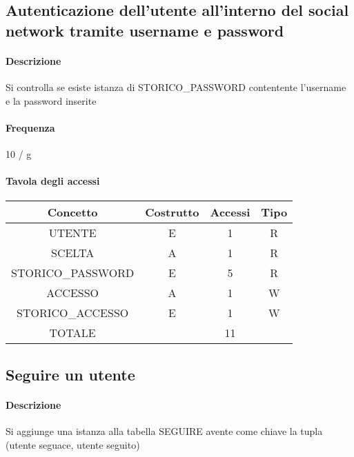 \documentclass[a4paper,12pt]{report}
\begin{document}
\subsection{Autenticazione dell'utente all'interno del social network tramite username e password} \label{autenticazione}
\paragraph{Descrizione} Si controlla se esiste istanza di STORICO\_PASSWORD contentente l'username e la password inserite
\paragraph{Frequenza} 10 / g
\begin{table}[H]
\paragraph{Tavola degli accessi\newline}
\begin{tabular}{|c|c|c|c|}
\hline
Concetto          & Costrutto & Accessi & Tipo \\ \hline
UTENTE            & E         & 1       & R    \\ \hline
SCELTA            & A         & 1       & R    \\ \hline
STORICO\_PASSWORD & E         & 5       & R    \\ \hline
ACCESSO           & A         & 1       & W    \\ \hline
STORICO\_ACCESSO  & E         & 1       & W    \\ \hline
TOTALE            &           & 11      &      \\ \hline
\end{tabular}
\end{table}
\subsection{Seguire un utente} \label{follow}
\paragraph{Descrizione} Si aggiunge una istanza alla tabella SEGUIRE avente come chiave la tupla (utente seguace, utente seguito)
\end{document}
